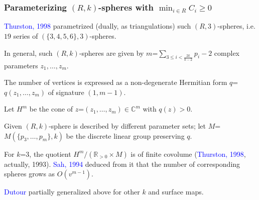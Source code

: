\documentclass{beamer}
\begin{document}
\begin{frame}\frametitle{Parameterizing $(R,k)$-spheres with $\min_{i\in 
R}C_i\ge 0$}

\textcolor{blue}{Thurston, 1998}  parametrized (dually,  as triangulations) such 
$(R,3)$-spheres, i.e. $19$ series of $(\{3,4,5,6\},3)$-spheres.

In general, such $(R,k)$-spheres are given by 
$m$=$\sum_{3\le i<\frac{2k}{k-2}}p_i-2$ complex parameters $z_1,\dots,z_m$.

The number of vertices
is expressed as a non-degenerate Hermitian form $q$=$q(z_1,\dots,z_m)$ of  
 signature $(1,m-1)$. 

Let $H^m$ be the cone of $z$=$(z_1,\dots,z_m)\in \mathbb{C}^m$ with $q(z)>0$.

Given $(R,k)$-sphere is  described by different parameter sets; let 
$M$=$M(\{p_3,\dots,p_m\},k)$ be  the discrete linear group preserving $q$.

For $k$=$3$,  the quotient 
$H^m/(\mathbb{R}_{>0}\times M)$ is of  finite covolume 
(\textcolor{blue}{Thurston, 1998}, actually, 1993). 
\textcolor{blue}{Sah, 1994} deduced from it that the number of
corresponding spheres grows as $O(v^{m-1})$.

\textcolor{blue}{Dutour} partially generalized above for other $k$ and surface maps.
\end{frame}
\end{document}
